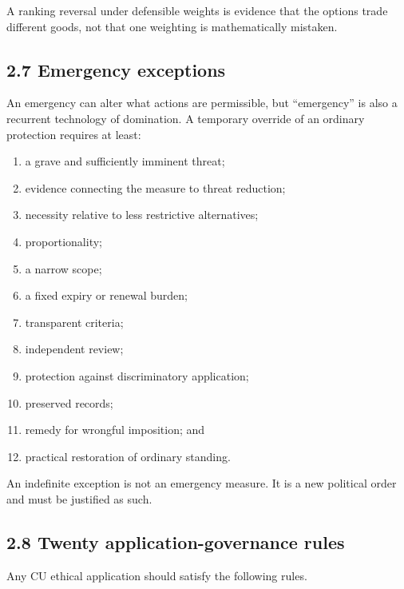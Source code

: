 \documentclass[
  11pt,
]{article}
\providecommand{\tightlist}{%
  \setlength{\itemsep}{0pt}\setlength{\parskip}{0pt}}
\begin{document}
A ranking reversal under defensible weights is evidence that the options
trade different goods, not that one weighting is mathematically
mistaken.

\subsection{2.7 Emergency exceptions}\label{emergency-exceptions}

An emergency can alter what actions are permissible, but ``emergency''
is also a recurrent technology of domination. A temporary override of an
ordinary protection requires at least:

\begin{enumerate}
\def\labelenumi{\arabic{enumi}.}
\tightlist
\item
  a grave and sufficiently imminent threat;
\item
  evidence connecting the measure to threat reduction;
\item
  necessity relative to less restrictive alternatives;
\item
  proportionality;
\item
  a narrow scope;
\item
  a fixed expiry or renewal burden;
\item
  transparent criteria;
\item
  independent review;
\item
  protection against discriminatory application;
\item
  preserved records;
\item
  remedy for wrongful imposition; and
\item
  practical restoration of ordinary standing.
\end{enumerate}

An indefinite exception is not an emergency measure. It is a new
political order and must be justified as such.

\subsection{2.8 Twenty application-governance
rules}\label{twenty-application-governance-rules}

Any CU ethical application should satisfy the following rules.
\end{document}
